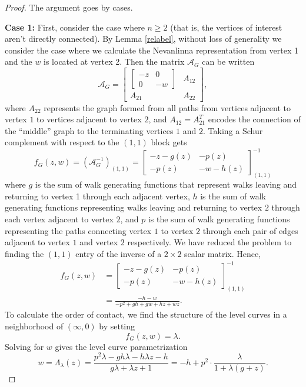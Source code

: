 \documentclass[10pt,a4paper]{amsart}
\newcommand\bbm{\begin{bmatrix}}
\newcommand\ebm{\end{bmatrix}}
\newcommand\la{\lambda}
\newcommand{\A}{\mathcal{A}}
\newcommand{\inv}{^{-1}}
\begin{document}
\begin{proof}
The argument goes by cases.

\textbf{Case 1:} First, consider the case where $n \geq 2$ (that is, the vertices of interest aren't directly connected). By Lemma \ref{relabel}, without loss of generality we consider the case where we calculate the Nevanlinna representation from vertex 1 and the $w$ is located at vertex 2. Then the matrix $\A_G$ can be written
\[
\A_G = \bbm \bbm -z & 0 \\ 0 & -w \ebm & A_{12} \\ A_{21} & A_{22} \ebm,
\]
where $A_{22}$ represents the graph formed from all paths from vertices adjacent to vertex $1$ to vertices adjacent to vertex $2$, and $A_{12} = A_{21}^T$ encodes the connection of the ``middle'' graph to the terminating vertices $1$ and $2$.
Taking a Schur complement with respect to the $(1,1)$ block gets
\[
f_G(z,w) = (\A_G\inv)_{(1,1)} = \bbm -z -g(z) & -p(z) \\ -p(z) & -w - h(z) \ebm\inv_{(1,1)}
\]
where $g$ is the sum of walk generating functions that represent walks leaving and returning to vertex 1 through each adjacent vertex, $h$ is the sum of walk generating functions representing walks leaving and returning to vertex $2$ through each vertex adjacent to vertex $2$, and $p$ is the sum of walk generating functions representing the paths connecting vertex $1$ to vertex $2$ through each pair of edges adjacent to vertex $1$ and vertex $2$ respectively. We have reduced the problem to finding the $(1,1)$ entry of the inverse of a $2 \times 2$ scalar matrix. Hence,
\begin{align*}
f_G(z,w) &= \bbm -z -g(z) & -p(z) \\ -p(z) & -w - h(z) \ebm\inv_{(1,1)} \\
&= \frac{-h-w}{-p^2+g h+g w+h z+w z}.
\end{align*}
To calculate the order of contact, we find the structure of the level curves in a neighborhood of $(\infty, 0)$ by setting $$f_G(z,w) = \la.$$ Solving for $w$ gives the level curve parametrization
\[
w = \Lambda_\la(z) = \frac{p^2 \la-g h \la-h \la z-h}{g \la+\la z+1} = -h + p^2 \cdot \frac{\la}{1 + \la(g + z)}.
\]



\end{proof}
\end{document}
